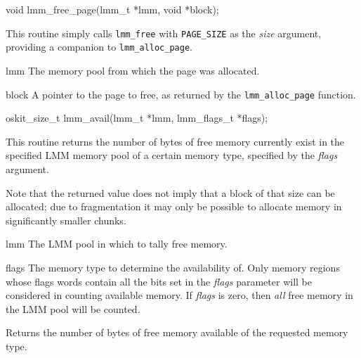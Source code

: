 \label{lmm-free-page}
\begin{apisyn}

	\funcproto void lmm_free_page(lmm_t *lmm, void *block);
\end{apisyn}
\begin{apidesc}
	This routine simply calls {\tt lmm_free}
	with {\tt PAGE_SIZE} as the \emph{size} argument,
	providing a companion to {\tt lmm_alloc_page}.
\end{apidesc}
\begin{apiparm}
	\item[lmm]
		The memory pool from which the page was allocated.
	\item[block]
		A pointer to the page to free,
		as returned by the {\tt lmm_alloc_page} function.
\end{apiparm}

\begin{apisyn}

	\funcproto oskit_size_t lmm_avail(lmm_t *lmm, lmm_flags_t *flags);
\end{apisyn}
\begin{apidesc}
	This routine returns the number of bytes of free memory
	currently exist in the specified LMM memory pool
	of a certain memory type, specified by the \emph{flags} argument.

	Note that the returned value does not imply
	that a block of that size can be allocated;
	due to fragmentation it may only be possible
	to allocate memory in significantly smaller chunks.
\end{apidesc}
\begin{apiparm}
	\item[lmm]
		The LMM pool in which to tally free memory.
	\item[flags]
		The memory type to determine the availability of.
		Only memory regions whose flags words
		contain all the bits set in the \emph{flags} parameter
		will be considered in counting available memory.
		If \emph{flags} is zero,
		then \emph{all} free memory in the LMM pool will be counted.
\end{apiparm}
\begin{apiret}
	Returns the number of bytes of free memory available
	of the requested memory type.
\end{apiret}

